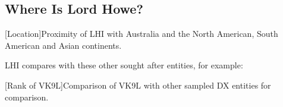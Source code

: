 \documentclass[11pt]{article}
\begin{document}
\subsection{Where Is Lord Howe?}

\vskip2mm
\noindent%
\begin{minipage}{\linewidth}%
\captionsetup{width=0.8\linewidth}
[Location]{Proximity of LHI with Australia and the North American, South American and Asian continents.}
\label{prox}
\end{minipage}
\vskip3mm

\par
LHI compares with these other sought after entities, for example:
\vskip2mm

\noindent%
\begin{minipage}{\linewidth}%
\captionsetup{width=0.8\linewidth}
[Rank of VK9L]{Comparison of VK9L with other sampled DX entities for
comparison.}
\label{compare}
\end{minipage}
\end{document}

